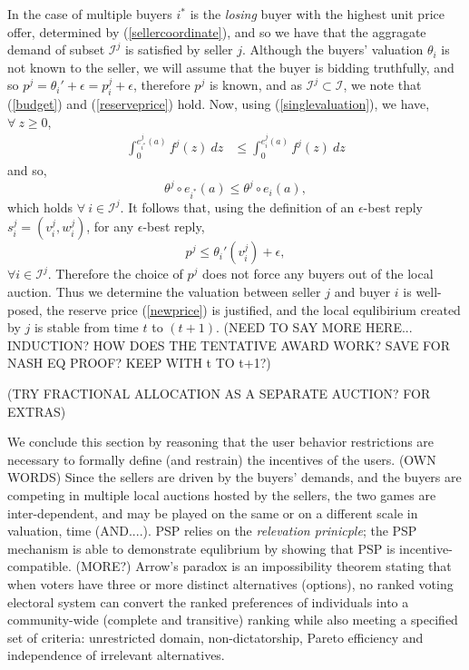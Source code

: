 \documentclass[12pt]{article}
\theoremstyle{definition}
\newcommand{\mcI}{\mathcal{I}}
\begin{document}
\begin{multicols}{2}
In the case of multiple buyers $i^*$ is the \emph{losing} buyer with the highest unit
price offer, determined by (\ref{sellercoordinate}),
and so we have that the aggragate demand of subset $\mcI^j$ is satisfied by seller $j$.
Although the buyers' valuation $\theta_i$ is not known to the seller, we will assume
that the buyer is bidding truthfully, and so $p^j = {\theta_i}' + \epsilon
=p_i^j + \epsilon$, therefore $p^j$ is known, and as $\mcI^j\subset \mcI$, we
note that (\ref{budget}) and (\ref{reserveprice}) hold. Now, using
(\ref{singlevaluation}), we have, $\forall \ z\ge 0$,
\begin{align*}
    \int_0^{e_{i^*}^{j}(a)} f^{j}(z)\ dz &\le\int_0^{e_i^{j}(a)}
f^{j}(z) \ dz 
\end{align*}
and so,
$$
    \theta^j\circ e_{i^*}(a) \le \theta^j\circ e_i(a),
$$
which holds $\forall \ i \in \mcI^j$.
It follows that, using
the definition of an $\epsilon$-best reply $s_i^j = (v_i^j, w_i^j)$,  
for any $\epsilon$-best reply, 
$$
    p^j \le {\theta_i}'(v_i^j) + \epsilon,
$$
$\forall i \in \mcI^j$.
Therefore the choice of $p^j$ does not force any buyers out of the local
auction. Thus we determine the valuation between seller
$j$ and buyer $i$ is well-posed, the reserve price (\ref{newprice}) is justified, and the local
equlibirium created by $j$ is stable from time $t$ to $(t+1)$. 
(NEED TO SAY MORE HERE... INDUCTION? HOW DOES THE TENTATIVE AWARD WORK? SAVE
FOR NASH EQ PROOF? KEEP WITH t TO t+1?)

(TRY FRACTIONAL ALLOCATION AS A SEPARATE AUCTION? FOR EXTRAS)

We conclude this section by reasoning that the user behavior restrictions are
necessary to formally define (and restrain) the incentives of the users. (OWN
WORDS) Since the sellers are driven by the buyers' demands, and the buyers are
competing in multiple local auctions hosted by the sellers, the two games are
inter-dependent, and may be played on the same or on a different scale in
valuation, time (AND....). PSP relies on the \emph{relevation prinicple}; the
PSP mechanism is able to demonstrate equlibrium by showing that PSP is
incentive-compatible. (MORE?)
Arrow's paradox is an impossibility theorem stating that when voters have three
or more distinct alternatives (options), no ranked voting electoral system can
convert the ranked preferences of individuals into a community-wide (complete
and transitive) ranking while also meeting a specified set of criteria:
unrestricted domain, non-dictatorship, Pareto efficiency and independence of
irrelevant alternatives.


\end{multicols}
\end{document}
